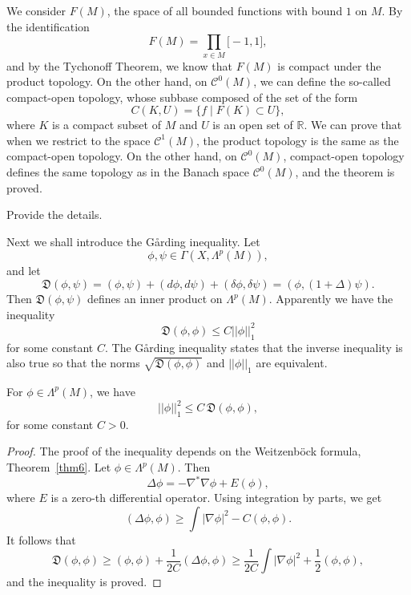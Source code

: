 We consider $F(M)$, the space of all bounded functions with bound $1$ on $M$. By the identification
\[
F(M)=\prod_{x\in M}\mathbb [-1,1],
\] and by the Tychonoff Theorem, we know that $F(M)$ is compact under the product topology. On the other hand, on $\mathcal C^0(M)$, we can define the so-called compact-open topology, whose subbase composed of the set of the form
\[
C(K,U)=\{f\mid F(K)\subset U\},
\]
where $K$ is a compact subset of $M$ and $U$ is an open set of $\mathbb R$.
We can prove that when we restrict to the space $\mathcal C^1(M)$, the product topology is the same as the compact-open topology. On the other hand, on $\mathcal C^0(M)$, compact-open topology defines the same topology as in the Banach space $\mathcal C^0(M)$, and the theorem is proved.

\begin{ex} Provide the details.
\end{ex}

 




Next we shall introduce the G\aa rding inequality. 
Let
\[
\phi,\psi\in\Gamma(X,\Lambda^p(M)),
\]
and let
\[
\mathfrak D (\phi,\psi)=(\phi,\psi)
+(d\phi, d\psi)+(\delta\phi,
\delta\psi)=(\phi, (1+\Delta)\psi).
\]
Then $\mathfrak D(\phi,\psi)$ defines an inner product
on $\Lambda^p(M)$. Apparently we have the
inequality
\[
\mathfrak D(\phi,\phi)\leq C||\phi||_1^2
\]
for some constant $C$. The G\aa rding inequality states
that the inverse inequality is also true so that
the norms $\sqrt{\mathfrak D(\phi,\phi)}$ and $||\phi||_1$
are equivalent.




\begin{theorem} 
For $\phi\in\Lambda^p(M)$, we have
\begin{equation}\label{2-10}
||\phi||_1^2\leq C\,\mathfrak D(\phi,\phi),
\end{equation}
for some constant $C>0$.
\end{theorem}



\begin{proof} The proof of the
inequality depends  on the Weitzenb\"ock formula, Theorem~\ref{thm6}.
Let $\phi\in\Lambda^p(M)$. Then
\begin{equation}\Delta\phi=-\nabla^*\nabla\phi+E(\phi),
\end{equation}
where $E$ is a zero-th differential operator.
Using  integration
by parts, we get
\[
(\Delta\phi,\phi)\geq\int|\nabla\phi|^2-C(\phi,\phi).
\]
It follows that
\[
\mathfrak D(\phi,\phi)\geq (\phi,\phi)+\frac{1}{2C}(\Delta\phi,\phi)\geq
\frac{1}{2C}\int|\nabla\phi|^2+\frac 12 (\phi,\phi),
\]
and the inequality is proved.



\end{proof}

